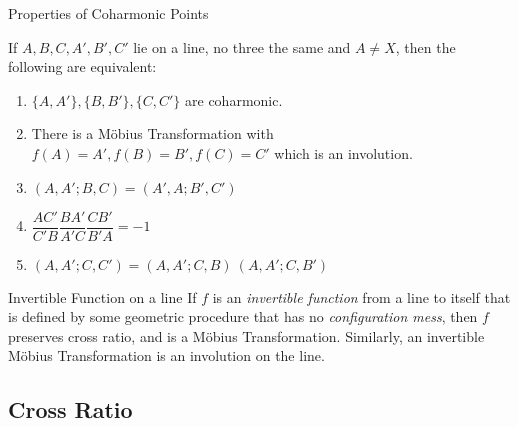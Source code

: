\theo{}
{Properties of Coharmonic Points}{
    If $ A, B, C, A', B', C' $ lie on a line, no three the same and $A\ne X$,
    then the following are equivalent:

    \begin{enumerate}[itemsep=0pt, left=20pt]
        \item $ \{A,A'\}, \{B, B'\}, \{C, C'\} $ are coharmonic.
        \item There is a Möbius Transformation with $ f(A)=A', f(B)=B',
            f(C)=C' $ which is an involution.
        \item $ (A, A'; B, C)=(A', A; B', C') $\vspace{.5em}
        \item $ \dfrac{AC'}{C'B}\dfrac{BA'}{A'C}\dfrac{CB'}{B'A}=-1 $\vspace{.5em}
        \item $ (A, A'; C, C') = (A, A'; C, B)\ (A, A'; C, B') $
    \end{enumerate}
}

\theo{}
{Invertible Function on a line}{
    If $ f $ is an \emph{invertible function} from a line to itself that is
    defined by some geometric procedure that has no \emph{configuration mess},
    then $ f $ preserves cross ratio, and is a Möbius Transformation. Similarly,
    an invertible Möbius Transformation is an involution on the line.
}


\newpage 
\subsection{Cross Ratio}

